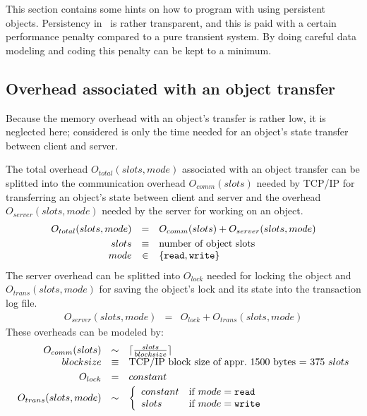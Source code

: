 This section contains some hints on how to program with using
persistent objects. Persistency in \plob\ is rather transparent, and
this is paid with a certain performance penalty compared to a pure
transient system. By doing careful data modeling and coding this
penalty can be kept to a minimum.

\subsection{Overhead associated with an object transfer}

Because the memory overhead with an object's transfer is rather low,
it is neglected here; considered is only the time needed for an
object's state transfer between client and server.

The total overhead $O_{total}(slots,mode)$ associated with an object
transfer can be splitted into the communication overhead
$O_{comm}(slots)$ needed by TCP/IP for
transferring an object's state between client and server and the
overhead $O_{server}(slots,mode)$ needed by the server for working on
an object.
%
\begin{displaymath}\begin{array}{rcl}
%
O_{total}(slots,mode)  &=
        & O_{comm}(slots) + O_{server}(slots,mode)\\[\smallskipamount]
%
slots &\equiv& \textrm{number of object slots}\\
mode &\in& \{ \texttt{read}, \texttt{write} \}
%
\end{array}\end{displaymath}
%
The server overhead can be splitted into $O_{lock}$ needed for
locking the object and $O_{trans}(slots,mode)$ for saving the
object's lock and its state into the transaction log file.
%
\begin{displaymath}\begin{array}{rcl}
O_{server}(slots,mode) &=& O_{lock} + O_{trans}(slots,mode)
\end{array}\end{displaymath}%
%
These overheads can be modeled by:
%
\begin{displaymath}\begin{array}{rcl}
%
O_{comm}(slots) &\sim& \lceil \frac{slots}{blocksize} \rceil\\
%
blocksize &\equiv
        &\textrm{TCP/IP block size of appr.\ 1500 bytes = 375
        $slots$}\\[\smallskipamount]
%
O_{lock} &=& constant\\[\smallskipamount]
%
O_{trans}(slots,mode) &\sim
        & \left\{%
\begin{array}{ll}%
constant & \textrm{if}\ mode = \texttt{read}\\
slots    & \textrm{if}\ mode = \texttt{write}
\end{array}\right .\\[\smallskipamount]
%
\end{array}\end{displaymath}
